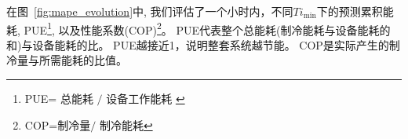 在图~\ref{fig:mape_evolution}中, 我们评估了一个小时内，不同$Ti_{\min}$下的预测累积能耗, PUE\footnote{PUE\text{ }=${\text {  总能耗 }}/{\text { 设备工作能耗 }}$\cite{song2015data}}, 以及性能系数(COP)\footnote{COP\text{ }=${\text {制冷量}}/{\text { 制冷能耗}}$\cite{song2015data}}。
PUE代表整个总能耗(制冷能耗与设备能耗的和)与设备能耗的比。
PUE越接近1，说明整套系统越节能。
COP是实际产生的制冷量与所需能耗的比值。

